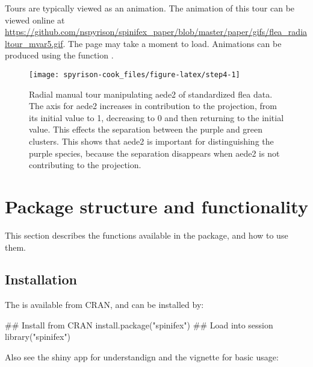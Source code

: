 Tours are typically viewed as an animation. The animation of this tour
can be viewed online at
\url{https://github.com/nspyrison/spinifex_paper/blob/master/paper/gifs/flea_radialtour_mvar5.gif}.
The page may take a moment to load. Animations can be produced using the
function .

\begin{Schunk}
\begin{figure}

{\centering \texttt{[image: spyrison-cook\_files/figure-latex/step4-1]} 

}

\caption[Radial manual tour manipulating aede2 of standardized flea data]{Radial manual tour manipulating aede2 of standardized flea data. The axis for aede2 increases in contribution to the projection, from its initial value to 1, decreasing to 0 and then returning to the initial value. This effects the separation between the purple and green clusters. This shows that aede2 is important for distinguishing the purple species, because the separation disappears when aede2 is not contributing to the projection.}\label{fig:step4}
\end{figure}
\end{Schunk}

\hypertarget{package-structure-and-functionality}{%
\section{Package structure and
functionality}\label{package-structure-and-functionality}}

This section describes the functions available in the package, and how
to use them.

\hypertarget{installation}{%
\subsection{Installation}\label{installation}}

The  is available from CRAN, and can be installed by:

\begin{Schunk}
\begin{Sinput}
## Install from CRAN
install.package("spinifex")
## Load into session
library("spinifex")
\end{Sinput}
\end{Schunk}

\noindent Also see the shiny app for understandign and the vignette for
basic usage:

